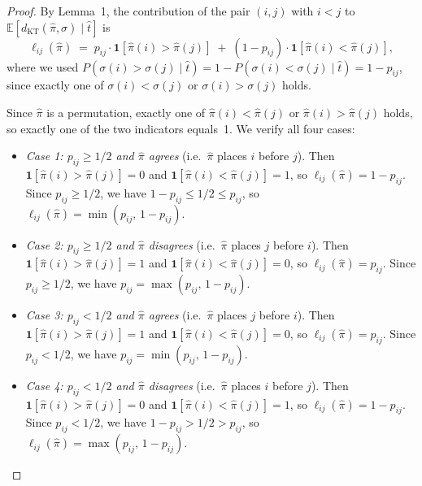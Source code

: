 \documentclass[11pt]{article}
\begin{document}
\begin{proof}
By Lemma~1, the contribution of the pair $(i, j)$ with $i < j$ to $\mathbb{E}[d_{\mathrm{KT}}(\hat{\pi}, \sigma) \mid \hat{t}]$ is
\begin{equation}
\ell_{ij}(\hat{\pi}) \;=\; p_{ij} \cdot \mathbf{1}[\hat{\pi}(i) > \hat{\pi}(j)] \;+\; (1 - p_{ij}) \cdot \mathbf{1}[\hat{\pi}(i) < \hat{\pi}(j)],
\end{equation}
where we used $P(\sigma(i) > \sigma(j) \mid \hat{t}) = 1 - P(\sigma(i) < \sigma(j) \mid \hat{t}) = 1 - p_{ij}$, since exactly one of $\sigma(i) < \sigma(j)$ or $\sigma(i) > \sigma(j)$ holds.

Since $\hat{\pi}$ is a permutation, exactly one of $\hat{\pi}(i) < \hat{\pi}(j)$ or $\hat{\pi}(i) > \hat{\pi}(j)$ holds, so exactly one of the two indicators equals~1. We verify all four cases:
\begin{itemize}
\item \emph{Case 1: $p_{ij} \ge 1/2$ and $\hat{\pi}$ agrees} (i.e.\ $\hat{\pi}$ places $i$ before $j$). Then $\mathbf{1}[\hat{\pi}(i) > \hat{\pi}(j)] = 0$ and $\mathbf{1}[\hat{\pi}(i) < \hat{\pi}(j)] = 1$, so $\ell_{ij}(\hat{\pi}) = 1 - p_{ij}$. Since $p_{ij} \ge 1/2$, we have $1 - p_{ij} \le 1/2 \le p_{ij}$, so $\ell_{ij}(\hat{\pi}) = \min(p_{ij},\, 1 - p_{ij})$.

\item \emph{Case 2: $p_{ij} \ge 1/2$ and $\hat{\pi}$ disagrees} (i.e.\ $\hat{\pi}$ places $j$ before $i$). Then $\mathbf{1}[\hat{\pi}(i) > \hat{\pi}(j)] = 1$ and $\mathbf{1}[\hat{\pi}(i) < \hat{\pi}(j)] = 0$, so $\ell_{ij}(\hat{\pi}) = p_{ij}$. Since $p_{ij} \ge 1/2$, we have $p_{ij} = \max(p_{ij},\, 1 - p_{ij})$.

\item \emph{Case 3: $p_{ij} < 1/2$ and $\hat{\pi}$ agrees} (i.e.\ $\hat{\pi}$ places $j$ before $i$). Then $\mathbf{1}[\hat{\pi}(i) > \hat{\pi}(j)] = 1$ and $\mathbf{1}[\hat{\pi}(i) < \hat{\pi}(j)] = 0$, so $\ell_{ij}(\hat{\pi}) = p_{ij}$. Since $p_{ij} < 1/2$, we have $p_{ij} = \min(p_{ij},\, 1 - p_{ij})$.

\item \emph{Case 4: $p_{ij} < 1/2$ and $\hat{\pi}$ disagrees} (i.e.\ $\hat{\pi}$ places $i$ before $j$). Then $\mathbf{1}[\hat{\pi}(i) > \hat{\pi}(j)] = 0$ and $\mathbf{1}[\hat{\pi}(i) < \hat{\pi}(j)] = 1$, so $\ell_{ij}(\hat{\pi}) = 1 - p_{ij}$. Since $p_{ij} < 1/2$, we have $1 - p_{ij} > 1/2 > p_{ij}$, so $\ell_{ij}(\hat{\pi}) = \max(p_{ij},\, 1 - p_{ij})$.
\end{itemize}


\end{proof}
\end{document}
